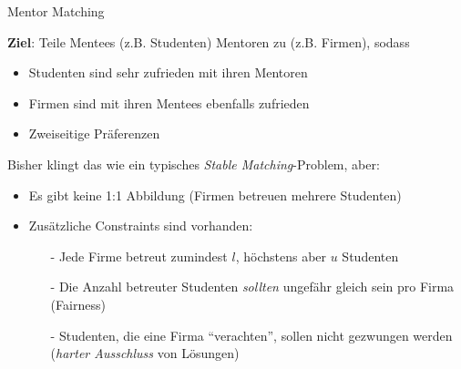 

\begin{frame}[fragile]{Mentor Matching}

\textbf{Ziel}: Teile Mentees (z.B. Studenten) Mentoren zu (z.B. Firmen), sodass
\begin{itemize}
\item Studenten sind sehr zufrieden mit ihren Mentoren
\item Firmen sind mit ihren Mentees ebenfalls zufrieden
\item Zweiseitige Präferenzen
\end{itemize}

\vspace*{2ex}

Bisher klingt das wie ein typisches \emph{Stable Matching}-Problem, aber:

\begin{itemize}
\item Es gibt keine 1:1 Abbildung (Firmen betreuen mehrere Studenten)
\item Zusätzliche Constraints sind vorhanden:
\begin{itemize}
\item[-] Jede Firme betreut zumindest $l$, höchstens aber $u$ Studenten
\item[-] Die Anzahl betreuter Studenten \emph{sollten} ungefähr gleich sein pro Firma (Fairness)
\item[-] Studenten, die eine Firma ``verachten'', sollen nicht gezwungen werden (\emph{harter Ausschluss} von Lösungen)
\end{itemize}
\end{itemize}
\end{frame}


